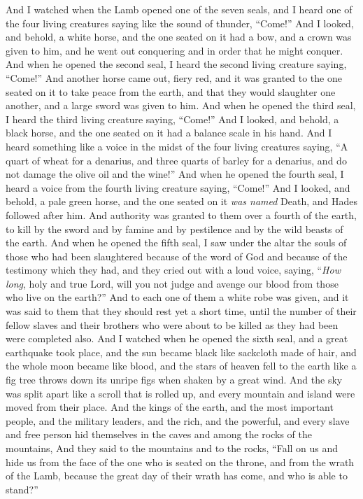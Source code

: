 \begin{biblechapter} %
 And I watched when the Lamb opened one of the seven seals, and I heard one of the four living creatures saying like the sound of thunder, “Come!”
\verse And I looked, and behold, a white horse, and the one seated on it had a bow, and a crown was given to him, and he went out conquering and in order that he might conquer.
\verse And when he opened the second seal, I heard the second living creature saying, “Come!”
\verse And another horse came out, fiery red, and it was granted to the one seated on it to take peace from the earth, and that they would slaughter one another, and a large sword was given to him.
\verse And when he opened the third seal, I heard the third living creature saying, “Come!” And I looked, and behold, a black horse, and the one seated on it had a balance scale in his hand.
\verse And I heard something like a voice in the midst of the four living creatures saying, “A quart of wheat for a denarius, and three quarts of barley for a denarius, and do not damage the olive oil and the wine!”
\verse And when he opened the fourth seal, I heard a voice from the fourth living creature saying, “Come!”
\verse And I looked, and behold, a pale green horse, and the one seated on it \textit{was named} Death, and Hades followed after him. And authority was granted to them over a fourth of the earth, to kill by the sword and by famine and by pestilence and by the wild beasts of the earth.
\verse And when he opened the fifth seal, I saw under the altar the souls of those who had been slaughtered because of the word of God and because of the testimony which they had,
\verse and they cried out with a loud voice, saying, “\textit{How long}, holy and true Lord, will you not judge and avenge our blood from those who live on the earth?”
\verse And to each one of them a white robe was given, and it was said to them that they should rest yet a short time, until the number of their fellow slaves and their brothers who were about to be killed as they had been were completed also.
\verse And I watched when he opened the sixth seal, and a great earthquake took place, and the sun became black like sackcloth made of hair, and the whole moon became like blood,
\verse and the stars of heaven fell to the earth like a fig tree throws down its unripe figs when shaken by a great wind.
\verse And the sky was split apart like a scroll that is rolled up, and every mountain and island were moved from their place.
\verse And the kings of the earth, and the most important people, and the military leaders, and the rich, and the powerful, and every slave and free person hid themselves in the caves and among the rocks of the mountains,
\verse And they said to the mountains and to the rocks, “Fall on us and hide us from the face of the one who is seated on the throne, and from the wrath of the Lamb,
\verse because the great day of their wrath has come, and who is able to stand?”
\end{biblechapter}

